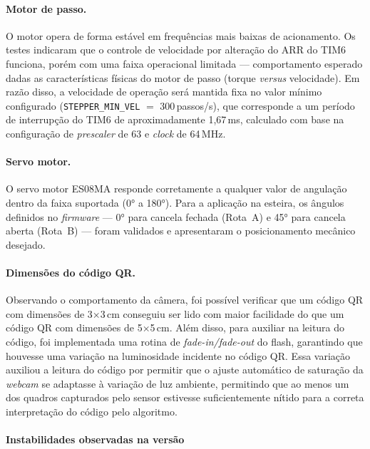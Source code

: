 \paragraph{Motor de passo.}
O motor opera de forma estável em frequências mais baixas de acionamento. Os testes indicaram que o controle de velocidade por alteração do ARR do TIM6 funciona, porém com uma faixa operacional limitada --- comportamento esperado dadas as características físicas do motor de passo (torque \textit{versus} velocidade). Em razão disso, a velocidade de operação será mantida fixa no valor mínimo configurado (\texttt{STEPPER\_MIN\_VEL} $=$ 300\,passos/s), que corresponde a um período de interrupção do TIM6 de aproximadamente 1,67\,ms, calculado com base na configuração de \textit{prescaler} de 63 e \textit{clock} de 64\,MHz.

\paragraph{Servo motor.}
O servo motor ES08MA responde corretamente a qualquer valor de angulação dentro da faixa suportada (0° a 180°). Para a aplicação na esteira, os ângulos definidos no \textit{firmware} --- 0° para cancela fechada (Rota~A) e 45° para cancela aberta (Rota~B) --- foram validados e apresentaram o posicionamento mecânico desejado.

\paragraph{Dimensões do código QR.}
Observando o comportamento da câmera, foi possível verificar que um código QR com dimensões de 3×3\,cm conseguiu ser lido com maior facilidade do que um código QR com dimensões de 5×5\,cm. Além disso, para auxiliar na leitura do código, foi implementada uma rotina de \textit{fade-in/fade-out} do flash, garantindo que houvesse uma variação na luminosidade incidente no código QR. Essa variação auxiliou a leitura do código por permitir que o ajuste automático de saturação da \textit{webcam} se adaptasse à variação de luz ambiente, permitindo que ao menos um dos quadros capturados pelo sensor estivesse suficientemente nítido para a correta interpretação do código pelo algoritmo.

\paragraph{Instabilidades observadas na versão}

